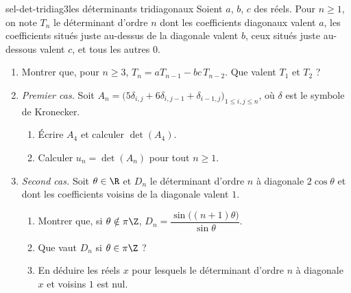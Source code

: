 \begin{exo}{sel-det-tridiag}{3}{les déterminants tridiagonaux}
Soient $a$, $b$, $c$ des réels. Pour $n\geq1$, on note $T_n$ le déterminant d'ordre $n$ dont les coefficients diagonaux valent $a$, les coefficients situés juste au-dessus de la diagonale valent $b$, ceux situés juste au-dessous valent $c$, et tous les autres $0$.
\begin{enumerate}
\item Montrer que, pour $n\geq3$, $T_n=aT_{n-1}-bc\,T_{n-2}$. Que valent $T_1$ et $T_2$ ?
\item \emph{Premier cas.} Soit $A_n=\big(5\delta_{i,j}+6\delta_{i,j-1}+\delta_{i-1,j}\big)_{1\leq i,j\leq n}$, où $\delta$ est le symbole de Kronecker.
\begin{enumerate}
\item Écrire $A_4$ et calculer $\det(A_4)$.
\item Calculer $u_n=\det(A_n)$ pour tout $n\geq1$.
\end{enumerate}
\item \emph{Second cas.} Soit $\theta\in\R$ et $D_n$ le déterminant d'ordre $n$ à diagonale $2\cos\theta$ et dont les coefficients voisins de la diagonale valent $1$.
\begin{enumerate}
\item Montrer que, si $\theta\notin\pi\Z$, $D_n=\dfrac{\sin\big((n+1)\theta\big)}{\sin\theta}$.
\item Que vaut $D_n$ si $\theta\in\pi\Z$ ?
\item En déduire les réels $x$ pour lesquels le déterminant d'ordre $n$ à diagonale $x$ et voisins $1$ est nul.
\end{enumerate}
\end{enumerate}
\end{exo}

